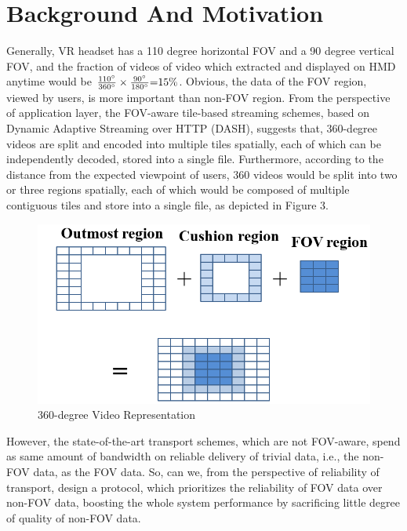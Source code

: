 \section{Background And Motivation}

	Generally, VR headset has a 110 degree horizontal FOV and a 90 degree vertical FOV, and the fraction of videos of video which extracted and displayed on HMD anytime would be $\frac{{110^\circ }}{{360^\circ }} \times \frac{{90^\circ }}{{180^\circ }}{\rm{ = }}15{\rm{\% }}$. Obvious, the data of the FOV region, viewed by users, is more important than non-FOV region.
	From the perspective of application layer, the FOV-aware tile-based streaming schemes, based on Dynamic Adaptive Streaming over HTTP (DASH), suggests that, 360-degree videos are split and encoded into multiple tiles spatially, each of which can be independently decoded, stored into a single file. Furthermore, according to the distance from the expected viewpoint of users, 360 videos would be split into two or three regions spatially, each of which would be composed of multiple contiguous tiles and store into a single file, as depicted in Figure 3.
	
	\begin{figure}[ht]
		\centering
		\includegraphics[scale=0.2]{paper_figs/tile_3_regions_0626.png}
		\caption{360-degree Video Representation}
		\label{paper_figs:pathdemo}
	\end{figure}	
	
	
	However, the state-of-the-art transport schemes, which are not FOV-aware, spend as same amount of bandwidth on reliable delivery of trivial data, i.e., the non-FOV data, as the FOV data. So, can we, from the perspective of reliability of transport, design a protocol, which prioritizes the reliability of FOV data over non-FOV data, boosting the whole system performance by sacrificing little degree of quality of non-FOV data.

